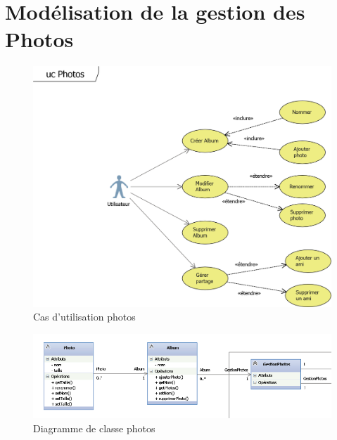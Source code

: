 \documentclass[11pt]{article}
\begin{document}
\section{Modélisation de la gestion des Photos}
\begin{figure}[!h]
        \centering \includegraphics[scale=1]{ucPhotos.png}
        \caption{Cas d'utilisation photos}
         \label{fig:ucPhotos}
\end{figure}
\begin{figure}[!h]
        \centering \includegraphics[scale=1]{photo.png}
        \caption{Diagramme de classe photos}
         \label{fig:photos}
\end{figure}

\newpage
\end{document}
